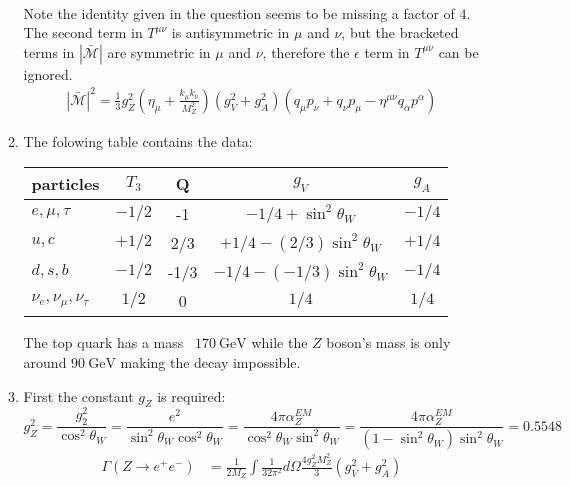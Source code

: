 \documentclass[12pt,a4]{article}
\begin{document}
\begin{enumerate}
\begin{enumerate}
\begin{align*}
        \end{align*}
        Note the identity given in the question seems to be missing a factor of $4$.
        The second term in $T^{\mu \nu}$ is antisymmetric in $\mu$ and $\nu$, but the bracketed terms in $|\bar{\mathcal{M}}|$ are symmetric in $\mu$ and $\nu$, therefore the $\epsilon$ term in $T^{\mu\nu}$ can be ignored.
        \begin{align*}
          |\bar{\mathcal{M}}|^2 = \frac{1}{3} g_Z^2 \left(\eta_{\mu} + \frac{k_\mu k_\nu }{M_Z^2}\right) (g_V^2 + g_A^2)\left( q_\mu p_\nu +  q_\nu p_\mu - \eta^{\mu\nu}  q_\alpha p^\alpha\right)
        \end{align*}
      \item
        The folowing table contains the data:
        \begin{table}[!h]
          \centering
          \begin{tabular}{l c c c c}
            \toprule
            particles         & $T_3$ & Q & $g_V$ & $g_A$ \\
            \midrule
            $e, \mu, \tau$    & $-1/2$   & -1 & $-1/4 + \sin^2\theta_W$ & $-1/4$ \\
            $u, c        $    & $+1/2$  & 2/3 & $+1/4 - (2 / 3) \sin^2\theta_W$ & $+1/4$ \\
            $d, s , b    $    & $-1/2$  & -1/3 & $-1/4 - (-1/3) \sin^2 \theta_W$ & $-1/4$ \\
            $\nu_e, \nu_\mu, \nu_\tau $ & $1/2$ & 0 & $1 / 4$ & $1 / 4$ \\
            \bottomrule
          \end{tabular}
        \end{table}
        The top quark has a mass ~$\SI{170}{\giga \eV}$ while the $Z$ boson's mass is only around $\SI{90}{\giga \eV}$ making the decay impossible.
      \item
        First the constant $g_Z$ is required:
        \begin{equation*}
          g_Z^2 = \frac{g_2^2}{\cos^2 \theta_W} = \frac{e^2}{\sin^2 \theta_W \cos^2 \theta_W} = \frac{4 \pi \alpha_Z^{EM}}{\cos^2 \theta_W \sin^2 \theta_W} = \frac{4 \pi \alpha_Z^{EM}}{(1 - \sin^2 \theta_W) \sin^2 \theta_W} = 0.5548
        \end{equation*}
        \begin{align*}
          \Gamma(Z \to e^+ e^-) 
                                &= \frac{1}{2 M_Z}\int \frac{1}{32 \pi^2} d\Omega \frac{4 g_Z^2 M_Z^2}{3} (g_V^2 + g_A^2) \\

\end{align*}
\end{enumerate}
\end{enumerate}
\end{document}
